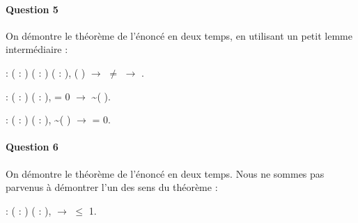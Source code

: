 \documentclass{report}
\begin{document}
\paragraph{Question 5}

On démontre le théorème de l'énoncé en deux temps, en utilisant un petit lemme intermédiaire :

\noindent\begin{coqdoccode}
\coqdocemptyline
\coqdocnoindent
{}  : \coqdockw{\ensuremath{\forall}} ( :  ) ( : ) ( : ),   (  ) \ensuremath{\rightarrow}  \ensuremath{\not=}  \ensuremath{\rightarrow}
\coqdocnoindent
{}  .\coqdoceol
\coqdocemptyline

\coqdocnoindent
{}  : \coqdockw{\ensuremath{\forall}} ( :  ) ( : ),    = 0 \ensuremath{\rightarrow} \~{}(  ).\coqdoceol
\coqdocemptyline

\coqdocnoindent
{}  : \coqdockw{\ensuremath{\forall}} ( :  ) ( : ), \~{}(  ) \ensuremath{\rightarrow}    = 0.\coqdoceol
\coqdocemptyline
\end{coqdoccode}


\paragraph{Question 6}

On démontre le théorème de l'énoncé en deux temps. Nous ne sommes pas parvenus à démontrer l'un des sens du théorème :

\noindent\begin{coqdoccode}
\coqdocemptyline
\coqdocnoindent
{}  : \coqdockw{\ensuremath{\forall}} ( :  ) ( : ),   \ensuremath{\rightarrow}    \ensuremath{\le} 1.\coqdoceol
\coqdocemptyline
\end{coqdoccode}
\end{document}
